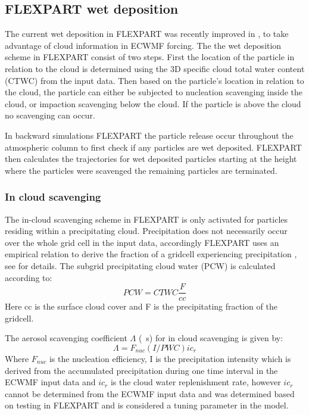 \subsection{FLEXPART wet deposition}

The current wet deposition in FLEXPART was recently improved in \textcite{flexpart_wetdep}, to take advantage of cloud information in ECWMF forcing. The the wet deposition scheme in FLEXPART consist of two steps. First the location of the particle in relation to the cloud is determined using the 3D specific cloud total
water content (CTWC) from the input data.  Then based on the particle's location in relation to the cloud, the particle can either be subjected to nucleation scavenging inside the cloud, or impaction scavenging below the cloud. If the particle is above the cloud no scavenging can occur. 

In backward simulations FLEXPART the particle release occur throughout the atmospheric column to first check if any particles are wet deposited. FLEXPART then calculates the trajectories for wet deposited particles starting at the height where the particles were scavenged the remaining particles are terminated.    
 
\subsubsection{In cloud scavenging}
The in-cloud scavenging scheme in FLEXPART is only activated for particles residing within a precipitating cloud. Precipitation does not necessarily occur over the whole grid cell in the input data, accordingly FLEXPART uses an empirical relation to derive the fraction of a gridcell experiencing precipitation , see \textcite{Flexpart-2005_ref_paper} for details. The subgrid precipitating cloud water (PCW) is calculated according to: 
\begin{equation}
    PCW = CTWC\frac{F}{cc}
\end{equation}
Here cc is the surface cloud cover and F is the precipitating fraction of the gridcell. 

The aerosol scavenging coefficient $\Lambda$ (\si{\per\s}) for in cloud scavenging is given by:
\begin{equation}
    \Lambda = F_{nuc}\left(I/PWC\right)ic_r
\end{equation}
Where $F_{nuc}$ is the nucleation efficiency, I is the precipitation intensity which is derived from the accumulated precipitation during one time interval in the ECWMF input data and $ic_r$ is the cloud water replenishment rate,  however $ic_r$ cannot be determined from the ECWMF input data and was determined based on testing in FLEXPART and is considered a tuning parameter in the model.   

